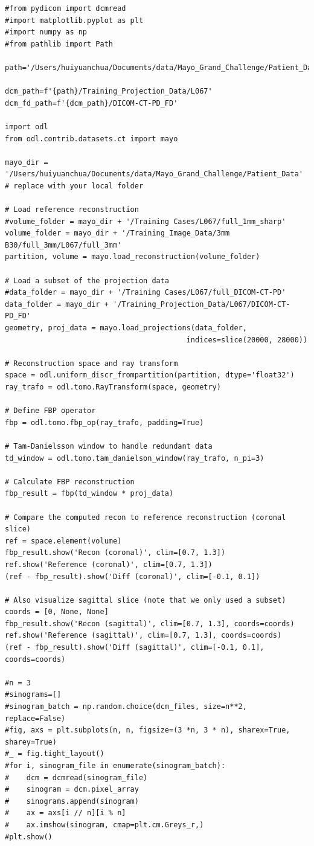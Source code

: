 \documentclass[a4paper, 11pt]{article}
\begin{document}
\begin{verbatim}
#from pydicom import dcmread
#import matplotlib.pyplot as plt
#import numpy as np
#from pathlib import Path

path='/Users/huiyuanchua/Documents/data/Mayo_Grand_Challenge/Patient_Data'

dcm_path=f'{path}/Training_Projection_Data/L067'
dcm_fd_path=f'{dcm_path}/DICOM-CT-PD_FD'

import odl
from odl.contrib.datasets.ct import mayo

mayo_dir = '/Users/huiyuanchua/Documents/data/Mayo_Grand_Challenge/Patient_Data'  # replace with your local folder

# Load reference reconstruction
#volume_folder = mayo_dir + '/Training Cases/L067/full_1mm_sharp'
volume_folder = mayo_dir + '/Training_Image_Data/3mm B30/full_3mm/L067/full_3mm'
partition, volume = mayo.load_reconstruction(volume_folder)

# Load a subset of the projection data
#data_folder = mayo_dir + '/Training Cases/L067/full_DICOM-CT-PD'
data_folder = mayo_dir + '/Training_Projection_Data/L067/DICOM-CT-PD_FD'
geometry, proj_data = mayo.load_projections(data_folder,
                                          indices=slice(20000, 28000))

# Reconstruction space and ray transform
space = odl.uniform_discr_frompartition(partition, dtype='float32')
ray_trafo = odl.tomo.RayTransform(space, geometry)

# Define FBP operator
fbp = odl.tomo.fbp_op(ray_trafo, padding=True)

# Tam-Danielsson window to handle redundant data
td_window = odl.tomo.tam_danielson_window(ray_trafo, n_pi=3)

# Calculate FBP reconstruction
fbp_result = fbp(td_window * proj_data)

# Compare the computed recon to reference reconstruction (coronal slice)
ref = space.element(volume)
fbp_result.show('Recon (coronal)', clim=[0.7, 1.3])
ref.show('Reference (coronal)', clim=[0.7, 1.3])
(ref - fbp_result).show('Diff (coronal)', clim=[-0.1, 0.1])

# Also visualize sagittal slice (note that we only used a subset)
coords = [0, None, None]
fbp_result.show('Recon (sagittal)', clim=[0.7, 1.3], coords=coords)
ref.show('Reference (sagittal)', clim=[0.7, 1.3], coords=coords)
(ref - fbp_result).show('Diff (sagittal)', clim=[-0.1, 0.1], coords=coords)

#n = 3
#sinograms=[]
#sinogram_batch = np.random.choice(dcm_files, size=n**2, replace=False)
#fig, axs = plt.subplots(n, n, figsize=(3 *n, 3 * n), sharex=True, sharey=True)
#_ = fig.tight_layout()
#for i, sinogram_file in enumerate(sinogram_batch):
#    dcm = dcmread(sinogram_file)
#    sinogram = dcm.pixel_array
#    sinograms.append(sinogram)
#    ax = axs[i // n][i % n]
#    ax.imshow(sinogram, cmap=plt.cm.Greys_r,)
#plt.show()
\end{verbatim}
\end{document}
